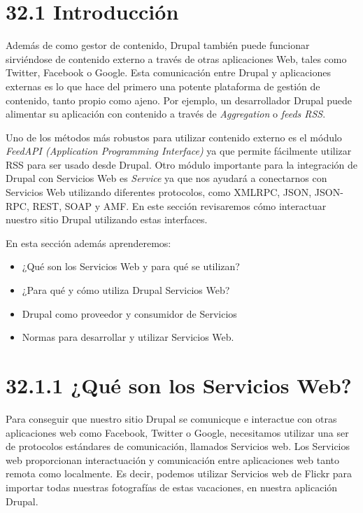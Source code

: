 \section{\Huge{32.1 Introducción}}

Además de como gestor de contenido, Drupal también puede funcionar sirviéndose de contenido externo 
a través de otras aplicaciones Web, tales como Twitter, Facebook o Google. Esta comunicación entre 
Drupal y aplicaciones externas es lo que hace del primero una potente plataforma de gestión 
de contenido, tanto propio como ajeno. Por ejemplo, un desarrollador Drupal puede alimentar su aplicación
con contenido a través de \emph{Aggregation} o \emph{feeds RSS}. 

Uno de los métodos más robustos para utilizar contenido externo es el módulo 
\emph{FeedAPI (Application Programming Interface)} ya que permite fácilmente utilizar RSS 
para ser usado desde Drupal. Otro módulo importante para la integración de Drupal con Servicios Web es 
\emph{Service} ya que nos ayudará a conectarnos con Servicios Web utilizando diferentes protocolos, como
XMLRPC, JSON, JSON-RPC, REST, SOAP y AMF. En este sección revisaremos cómo interactuar nuestro sitio Drupal
utilizando estas interfaces.

En esta sección además aprenderemos:

\begin{itemize}
  \item ¿Qué son los Servicios Web y para qué se utilizan?
  \item ¿Para qué y cómo utiliza Drupal Servicios Web?
  \item Drupal como proveedor y consumidor de Servicios
  \item Normas para desarrollar y utilizar Servicios Web.
\end{itemize}

\section{\Large{32.1.1 ¿Qué son los Servicios Web?}}

Para conseguir que nuestro sitio Drupal se comunicque e interactue con otras aplicaciones web como
Facebook, Twitter o Google, necesitamos utilizar una ser de protocolos estándares de comunicación, 
llamados Servicios web. Los Servicios web proporcionan interactuación y comunicación entre aplicaciones 
web tanto remota como localmente. Es decir, podemos utilizar Servicios web de Flickr para importar todas 
nuestras fotografías de estas vacaciones, en nuestra aplicación Drupal.

